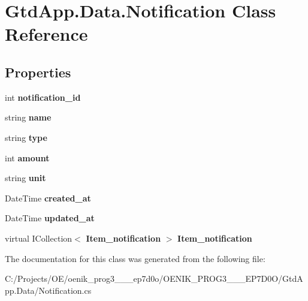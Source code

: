 \section{Gtd\+App.\+Data.\+Notification Class Reference}
\label{class_gtd_app_1_1_data_1_1_notification}
\subsection*{Properties}
\begin{DoxyCompactItemize}
\item 
\mbox{\label{class_gtd_app_1_1_data_1_1_notification_a629cc1b5894cfcc107786481ae39e835}} 
int {\bfseries notification\+\_\+id}\hspace{0.3cm}{\ttfamily  [get, set]}
\item 
\mbox{\label{class_gtd_app_1_1_data_1_1_notification_a801d990c4dbe4b8b677f1ce29787e08e}} 
string {\bfseries name}\hspace{0.3cm}{\ttfamily  [get, set]}
\item 
\mbox{\label{class_gtd_app_1_1_data_1_1_notification_ad56d2a1cf9a736ed614e47d2e133bd40}} 
string {\bfseries type}\hspace{0.3cm}{\ttfamily  [get, set]}
\item 
\mbox{\label{class_gtd_app_1_1_data_1_1_notification_a845a3fea1513fc5fe478dec062016069}} 
int {\bfseries amount}\hspace{0.3cm}{\ttfamily  [get, set]}
\item 
\mbox{\label{class_gtd_app_1_1_data_1_1_notification_ab7acbe0b03730d6658ecf831f25470d2}} 
string {\bfseries unit}\hspace{0.3cm}{\ttfamily  [get, set]}
\item 
\mbox{\label{class_gtd_app_1_1_data_1_1_notification_a04401e116659b10ee680872f82d32a51}} 
Date\+Time {\bfseries created\+\_\+at}\hspace{0.3cm}{\ttfamily  [get, set]}
\item 
\mbox{\label{class_gtd_app_1_1_data_1_1_notification_a1fbee509d8cb08e1e53fd6033822039a}} 
Date\+Time {\bfseries updated\+\_\+at}\hspace{0.3cm}{\ttfamily  [get, set]}
\item 
\mbox{\label{class_gtd_app_1_1_data_1_1_notification_adc8c31ae4c7e325437be520f03ffbed3}} 
virtual I\+Collection$<$ \textbf{ Item\+\_\+notification} $>$ {\bfseries Item\+\_\+notification}\hspace{0.3cm}{\ttfamily  [get, set]}
\end{DoxyCompactItemize}


The documentation for this class was generated from the following file\+:\begin{DoxyCompactItemize}
\item 
C\+:/\+Projects/\+O\+E/oenik\+\_\+prog3\+\_\+\_\+\_\+ep7d0o/\+O\+E\+N\+I\+K\+\_\+\+P\+R\+O\+G3\+\_\+\_\+\_\+\+E\+P7\+D0\+O/\+Gtd\+App.\+Data/Notification.\+cs\end{DoxyCompactItemize}
